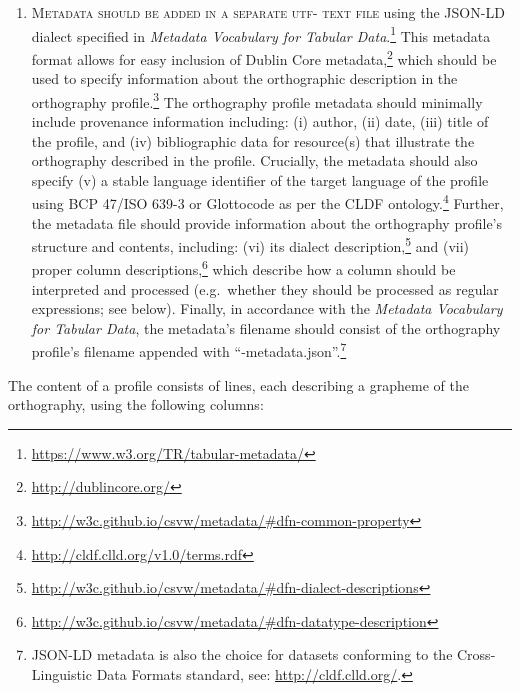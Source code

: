 \begin{enumerate}
	\item \textsc{Metadata should be added in a separate utf-\scalebox{0.8}{8} text file} using 
	   the JSON-LD dialect specified in \textit{Metadata Vocabulary for Tabular 
	   Data}.\footnote{\url{https://www.w3.org/TR/tabular-metadata/}} This metadata 
	   format allows for easy inclusion of Dublin Core metadata,\footnote{\url{http://dublincore.org/}} 
	   which should be used to specify information about the orthographic description 
	   in the orthography profile.\footnote{\url{http://w3c.github.io/csvw/metadata/\#dfn-common-property}} 
	   The orthography profile metadata should minimally include provenance information including: 
	   (i) author, (ii) date, (iii) title of the profile, and (iv)
       bibliographic data for resource(s) that illustrate the orthography
       described in the profile. Crucially, the metadata should also specify 
	   (v) a stable language identifier of the target language of the profile
       using BCP 47/ISO 639-3 or Glottocode as per the CLDF ontology.\footnote{\url{http://cldf.clld.org/v1.0/terms.rdf}}	   	   
	   Further, the metadata file should provide information about the orthography profile's structure and contents, 
	   including: (vi) its dialect description,\footnote{\url{http://w3c.github.io/csvw/metadata/\#dfn-dialect-descriptions}} 
	   and (vii) proper column descriptions,\footnote{\url{http://w3c.github.io/csvw/metadata/\#dfn-datatype-description}} 
	   which describe how a column should be interpreted and processed (e.g.\ whether they 
	   should be processed as regular expressions; see below).
	   Finally, in accordance with the \textit{Metadata Vocabulary for Tabular 
	   Data}, the metadata's filename should consist of the orthography 
	   profile's filename appended with ``-metadata.json''.\footnote{JSON-LD metadata 
	   is also the choice for datasets conforming to the Cross-Linguistic Data Formats standard, 
	   see: \url{http://cldf.clld.org/}.}

\end{enumerate}

\noindent The content of a profile consists of lines, each describing a grapheme
of the orthography, using the following columns:

